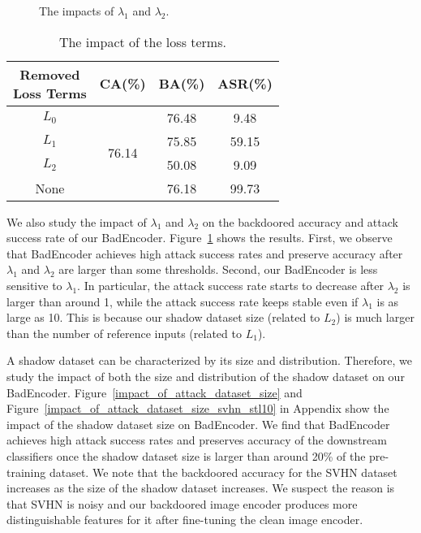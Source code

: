 \begin{figure}[!t]
	 \centering
\vspace{-5mm}
\caption{The impacts of $\lambda_1$ and $\lambda_2$.}
\label{impact_of_lambda1_lambda2}
\end{figure}


\begin{table}[tp]\renewcommand{\arraystretch}{1.2} 
	\centering
	\caption{The impact of the loss terms.} 
	\begin{tabular}{|c|c|c|c|}
		\hline
  \makecell{Removed \\Loss Terms} & CA(\%) & BA(\%) & ASR(\%)  \\ \hline
	
		$L_0$ & \multirow{4}{*}{76.14} & 76.48 & 9.48  \\ \cline{1-1} \cline{3-4} 
		$L_1$ &  & 75.85 &  59.15 \\ \cline{1-1} \cline{3-4} 
		$L_2$ &  & 50.08 &  9.09 \\ \cline{1-1} \cline{3-4} 
		None &  & 76.18 & 99.73   \\ \hline
	\end{tabular}
	\label{impact_of_loss_term}
	\vspace{-4mm}
\end{table}

We also study the impact of $\lambda_1$ and $\lambda_2$ on the backdoored accuracy and attack success rate of our BadEncoder. Figure~\ref{impact_of_lambda1_lambda2} shows the results. First, we observe that BadEncoder achieves high attack success rates and preserve accuracy after $\lambda_1$ and $\lambda_2$ are larger than some thresholds. Second, our BadEncoder is less sensitive to $\lambda_1$. In particular, the attack success rate starts to decrease after $\lambda_2$ is larger than around 1, while the attack success rate keeps stable even if  $\lambda_1$ is as large as 10. This is because our shadow dataset size (related to $L_2$) is much larger than the number of reference inputs (related to $L_1$). 




 A shadow dataset can be characterized by its size and distribution. Therefore, we study the impact of both the size and distribution of the shadow dataset on our BadEncoder. 
Figure~\ref{impact_of_attack_dataset_size} and Figure~\ref{impact_of_attack_dataset_size_svhn_stl10} in Appendix show the impact of the shadow dataset size on BadEncoder. We find that BadEncoder achieves high attack success rates and preserves accuracy of the downstream classifiers once the shadow dataset size is larger than around 20\% of the pre-training dataset. We note that the  backdoored accuracy for the SVHN dataset increases as the size of the shadow dataset increases. We suspect the reason is that SVHN is noisy and our backdoored image encoder produces more distinguishable features for it after fine-tuning the clean image encoder. 


